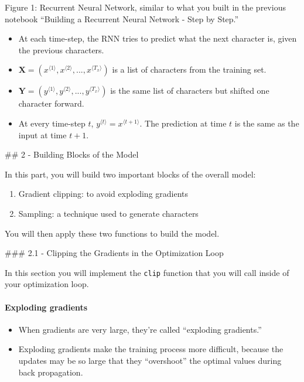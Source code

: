 \documentclass[11pt]{article}
\providecommand{\tightlist}{%
      \setlength{\itemsep}{0pt}\setlength{\parskip}{0pt}}
\begin{document}
Figure 1: Recurrent Neural Network, similar to what you built in the
previous notebook ``Building a Recurrent Neural Network - Step by
Step.''

\begin{itemize}
\tightlist
\item
  At each time-step, the RNN tries to predict what the next character
  is, given the previous characters.
\item
  \(\mathbf{X} = (x^{\langle 1 \rangle}, x^{\langle 2 \rangle}, ..., x^{\langle T_x \rangle})\)
  is a list of characters from the training set.
\item
  \(\mathbf{Y} = (y^{\langle 1 \rangle}, y^{\langle 2 \rangle}, ..., y^{\langle T_x \rangle})\)
  is the same list of characters but shifted one character forward.
\item
  At every time-step \(t\),
  \(y^{\langle t \rangle} = x^{\langle t+1 \rangle}\). The prediction at
  time \(t\) is the same as the input at time \(t + 1\).
\end{itemize}

    \#\# 2 - Building Blocks of the Model

In this part, you will build two important blocks of the overall model:

\begin{enumerate}
\def\labelenumi{\arabic{enumi}.}
\tightlist
\item
  Gradient clipping: to avoid exploding gradients
\item
  Sampling: a technique used to generate characters
\end{enumerate}

You will then apply these two functions to build the model.

    \#\#\# 2.1 - Clipping the Gradients in the Optimization Loop

In this section you will implement the \texttt{clip} function that you
will call inside of your optimization loop.

\hypertarget{exploding-gradients}{%
\paragraph{Exploding gradients}\label{exploding-gradients}}

\begin{itemize}
\tightlist
\item
  When gradients are very large, they're called ``exploding
  gradients.''\\
\item
  Exploding gradients make the training process more difficult, because
  the updates may be so large that they ``overshoot'' the optimal values
  during back propagation.
\end{itemize}
\end{document}
